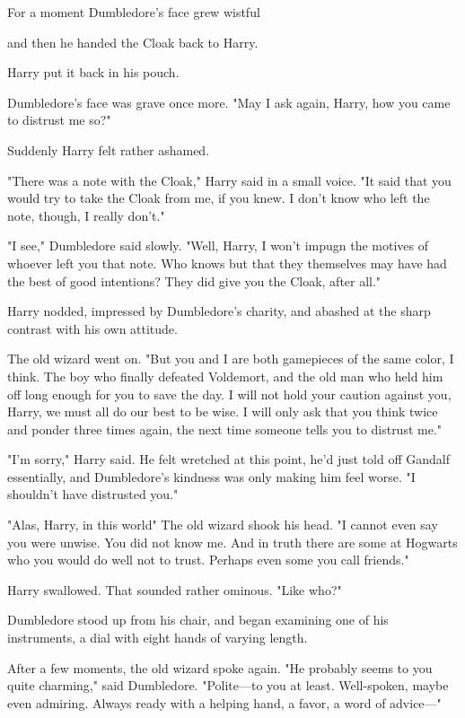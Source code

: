 For a moment Dumbledore's face grew wistful{\el}

{\el} and then he handed the Cloak back to Harry.

Harry put it back in his pouch.

Dumbledore's face was grave once more. "May I ask again, Harry, how you came to
distrust me so?"

Suddenly Harry felt rather ashamed.

"There was a note with the Cloak," Harry said in a small voice. "It said that
you would try to take the Cloak from me, if you knew. I don't know who left the
note, though, I really don't."

"I{\el} see," Dumbledore said slowly. "Well, Harry, I won't impugn the
motives of whoever left you that note. Who knows but that they themselves may
have had the best of good intentions? They did give you the Cloak, after all."

Harry nodded, impressed by Dumbledore's charity, and abashed at the sharp
contrast with his own attitude.

The old wizard went on. "But you and I are both gamepieces of the same color, I
think. The boy who finally defeated Voldemort, and the old man who held him off
long enough for you to save the day. I will not hold your caution against you,
Harry, we must all do our best to be wise. I will only ask that you think twice
and ponder three times again, the next time someone tells you to distrust me."

"I'm sorry," Harry said. He felt wretched at this point, he'd just told off
Gandalf essentially, and Dumbledore's kindness was only making him feel worse.
"I shouldn't have distrusted you."

"Alas, Harry, in this world{\el}" The old wizard shook his head. "I cannot
even say you were unwise. You did not know me. And in truth there are some at
Hogwarts who you would do well not to trust. Perhaps even some you call
friends."

Harry swallowed. That sounded rather ominous. "Like who?"

Dumbledore stood up from his chair, and began examining one of his instruments,
a dial with eight hands of varying length.

After a few moments, the old wizard spoke again. "He probably seems to you
quite charming," said Dumbledore. "Polite---to you at least. Well-spoken, maybe
even admiring. Always ready with a helping hand, a favor, a word of advice\mbox{---}"

